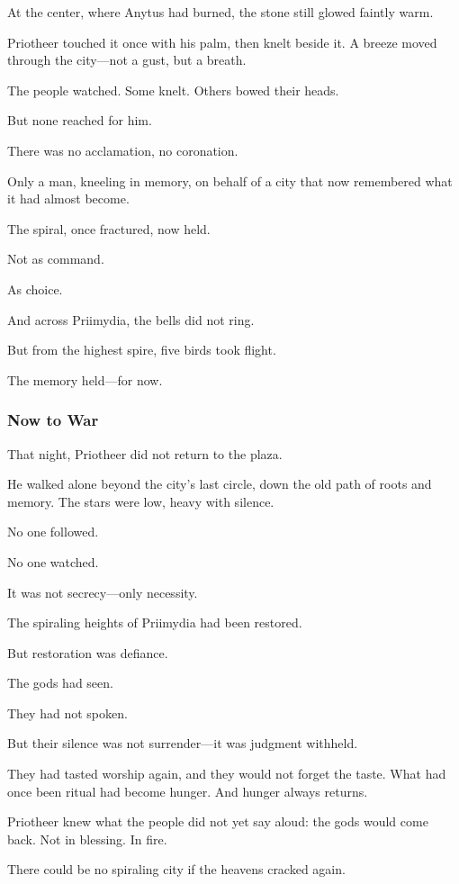 \documentclass[12pt]{article}
\begin{document}
At the center, where Anytus had burned, the stone still glowed faintly warm. 

Priotheer touched it once with his palm, then knelt beside it. A breeze moved through the city—not a gust, but a breath.

The people watched. Some knelt. Others bowed their heads.

But none reached for him.

There was no acclamation, no coronation. 

Only a man, kneeling in memory, on behalf of a city that now remembered what it had almost become.

The spiral, once fractured, now held.

Not as command.

As choice.

And across Priimydia, the bells did not ring.

But from the highest spire, five birds took flight.

The memory held—for now.

\dotfill

\subsubsection{Now to War}

That night, Priotheer did not return to the plaza.

He walked alone beyond the city’s last circle, down the old path of roots and memory. The stars were low, heavy with silence. 

No one followed.

No one watched. 

It was not secrecy—only necessity.

The spiraling heights of Priimydia had been restored. 

But restoration was defiance.

The gods had seen.

They had not spoken. 

But their silence was not surrender—it was judgment withheld. 

They had tasted worship again, and they would not forget the taste. What had once been ritual had become hunger. And hunger always returns.

Priotheer knew what the people did not yet say aloud: the gods would come back. Not in blessing. In fire.

There could be no spiraling city if the heavens cracked again. 
\end{document}
